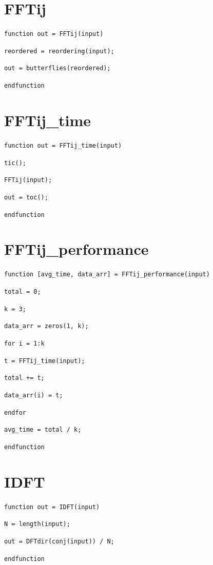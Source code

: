 \documentclass[a4paper, 12pt]{report}
\begin{document}
		\newpage
		\section{FFTij} %
		\label{sec:fftij_code}
			\texttt{function out = FFTij(input)}\par
			\texttt{reordered = reordering(input);}\par
			\texttt{out = butterflies(reordered);}\par\noindent
			\texttt{endfunction}

		\section{FFTij\_time} %
		\label{sec:fftij_time}
			\texttt{function out = FFTij\_time(input)}\par{}
			\texttt{tic();}\par
			\texttt{FFTij(input);}\par
			\texttt{out = toc();}\par
			\texttt{endfunction}\par

		\section{FFTij\_performance} %
		\label{sec:fftij_performance}
			\texttt{function [avg\_time, data\_arr] = FFTij\_performance(input)}\par
			\texttt{total = 0;}\par
			\texttt{k = 3;}\par
			\texttt{data\_arr = zeros(1, k);}\par
			\texttt{for i = 1:k}\par
			\hspace*{2em}\texttt{t = FFTij\_time(input);}\par
			\hspace*{2em}\texttt{total += t;}\par
			\texttt{data\_arr(i) = t;}\par
			\texttt{endfor}\par
			\texttt{avg\_time = total / k;}\par
			\noindent\texttt{endfunction}

		\section{IDFT} %
		\label{sec:idft_code}
			\texttt{function out = IDFT(input)}\par
	    	\indent\texttt{N = length(input);}\par
    		\indent\texttt{out = DFTdir(conj(input)) / N;}\par\noindent
    		\texttt{endfunction}
\end{document}
